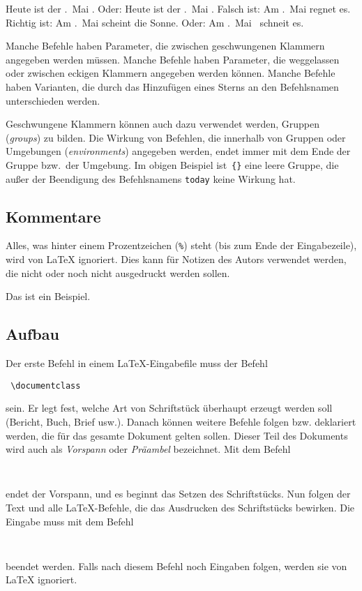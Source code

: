 \begin{LTXexample}[firstline=4]
\renewcommand*\today{%
  \the\numexpr{}\relax.~Mai \the\year}
\obeylines
Heute ist der \today.
Oder: Heute ist der \today .
Falsch ist:
 Am \today regnet es.
Richtig ist:
 Am \today{} scheint die Sonne.
 Oder: Am \today\ schneit es.
\end{LTXexample}
 


Manche Befehle haben Parameter, die zwischen geschwungenen Klammern angegeben 
werden müssen. Manche Befehle haben Parameter, die weggelassen oder zwischen
eckigen Klammern angegeben werden können. Manche Befehle haben Varianten, die 
durch das Hinzufügen eines Sterns an den Befehlsnamen unterschieden werden.

Geschwungene Klammern können auch dazu verwendet werden, Gruppen (\emph{groups})
zu bilden. Die Wirkung von Befehlen, die innerhalb von Gruppen oder Umgebungen 
(\emph{environments}) angegeben werden, endet immer mit dem Ende der Gruppe 
bzw.\ der Umgebung.  Im obigen Beispiel ist~\lstinline|{}| eine leere Gruppe, die 
außer der Beendigung des Befehlsnamens \texttt{today} keine Wirkung hat.
 
\subsection{Kommentare}
 
Alles, was hinter einem Prozentzeichen (\lstinline|%|) steht (bis zum Ende der 
Eingabezeile), wird von \LaTeX{} ignoriert. Dies kann für Notizen des Autors 
verwendet werden, die nicht oder noch nicht ausgedruckt werden sollen.
\begin{LTXexample}
Das ist ein %
Beispiel. 
\end{LTXexample}
 
\subsection{Aufbau}

Der erste Befehl in einem \LaTeX-Eingabefile muss der Befehl
\begin{lstlisting}
 \documentclass
\end{lstlisting}
sein. Er legt fest, welche Art von Schriftstück überhaupt erzeugt werden soll
(Bericht, Buch, Brief usw.). Danach können weitere Befehle folgen bzw. 
deklariert werden, die für das gesamte Dokument gelten sollen.  Dieser Teil des 
Dokuments wird auch als \emph{Vorspann} oder \emph{Präambel} bezeichnet. Mit dem
Befehl
\begin{lstlisting}
 
\end{lstlisting}
endet der Vorspann, und es beginnt das Setzen des Schriftstücks. Nun folgen der 
Text und alle \LaTeX-Befehle, die das Ausdrucken des Schriftstücks bewirken.
Die Eingabe muss mit dem Befehl
\begin{lstlisting}
 
\end{lstlisting}
beendet werden. Falls nach diesem Befehl noch Eingaben folgen, werden sie von
\LaTeX{} ignoriert.
 
